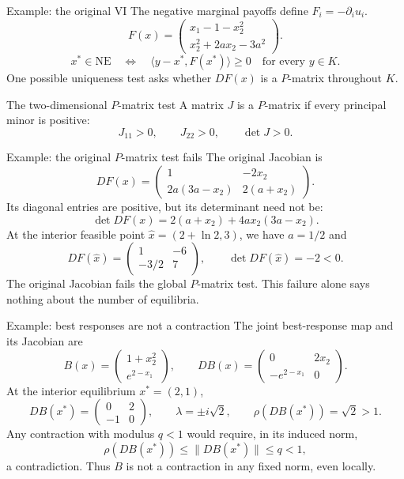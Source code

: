 \documentclass[11pt,aspectratio=169]{beamer}
\theoremstyle{plain}
\theoremstyle{definition}
\newcommand{\compactmath}{%
 \setlength{\abovedisplayskip}{4pt}\setlength{\belowdisplayskip}{4pt}%
 \setlength{\abovedisplayshortskip}{2pt}\setlength{\belowdisplayshortskip}{4pt}}
\begin{document}
\begin{frame}{Example: the original VI}
\compactmath
The negative marginal payoffs define $F_i=-\partial_i u_i$.
\[
 F(x)=\begin{pmatrix}
 x_1-1-x_2^2\\
 x_2^2+2a x_2-3a^2
 \end{pmatrix}.
\]
\[
 x^*\in\mathrm{NE}
 \quad\Longleftrightarrow\quad
 \langle y-x^*,F(x^*)\rangle\geq0\quad\text{for every }y\in K.
\]
One possible uniqueness test asks whether $DF(x)$ is a $P$-matrix throughout $K$.
\begin{block}{The two-dimensional $P$-matrix test}
A matrix $J$ is a $P$-matrix if every principal minor is positive:
\[
 J_{11}>0,\qquad J_{22}>0,\qquad \det J>0.
\]
\end{block}
\end{frame}


\begin{frame}{Example: the original $P$-matrix test fails}
\compactmath
The original Jacobian is
\[
 DF(x)=\begin{pmatrix}
 1&-2x_2\\
 2a(3a-x_2)&2(a+x_2)
 \end{pmatrix}.
\]
Its diagonal entries are positive, but its determinant need not be:
\[
 \det DF(x)=2(a+x_2)+4a x_2(3a-x_2).
\]
At the interior feasible point $\widehat x=(2+\ln2,3)$, we have $a=1/2$ and
\[
 DF(\widehat x)=\begin{pmatrix}1&-6\\-3/2&7\end{pmatrix},
 \qquad \boxed{\det DF(\widehat x)=-2<0.}
\]
The original Jacobian fails the global $P$-matrix test.
This failure alone says nothing about the number of equilibria.
\end{frame}


\begin{frame}{Example: best responses are not a contraction}
\compactmath
The joint best-response map and its Jacobian are
\[
 B(x)=\begin{pmatrix}1+x_2^2\\e^{2-x_1}\end{pmatrix},\qquad
 DB(x)=\begin{pmatrix}0&2x_2\\-e^{2-x_1}&0\end{pmatrix}.
\]
At the interior equilibrium $x^*=(2,1)$,
\[
 DB(x^*)=\begin{pmatrix}0&2\\-1&0\end{pmatrix},\qquad
 \lambda=\pm i\sqrt2,\qquad \rho(DB(x^*))=\sqrt2>1.
\]
Any contraction with modulus $q<1$ would require, in its induced norm,
\[
 \rho(DB(x^*))\leq\lVert DB(x^*)\rVert\leq q<1,
\]
a contradiction. Thus $B$ is not a contraction in any fixed norm, even locally.
\end{frame}
\end{document}
